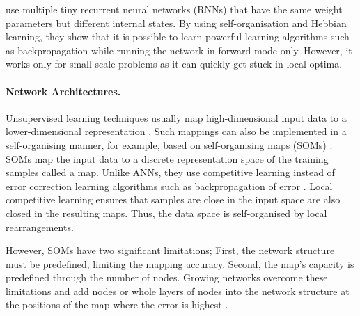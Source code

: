  use multiple tiny recurrent neural networks (RNNs) that have the same weight parameters but different internal states.
By using self-organisation and Hebbian learning, they show that it is possible to learn powerful learning algorithms such as backpropagation while running the network in forward mode only.
However, it works only for small-scale problems as it can quickly get stuck in local optima.



\paragraph{Network Architectures.}
Unsupervised learning techniques usually map high-dimensional input data to a lower-dimensional representation . Such mappings can also be implemented in a self-organising manner, for example, based on self-organising maps (SOMs) .
SOMs map the input data to a discrete representation space of the training samples called a map.
Unlike ANNs, they use competitive learning  instead of error correction learning algorithms such as backpropagation of error .
Local competitive learning ensures that samples are close in the input space are also closed in the resulting maps.
Thus, the data space is self-organised by local rearrangements.

However, SOMs have two significant limitations; First, the network structure must be predefined, limiting the mapping accuracy. Second, the map's capacity is predefined through the number of nodes.
Growing networks overcome these limitations and add nodes or whole layers of nodes into the network structure at the positions of the map where the error is highest .


